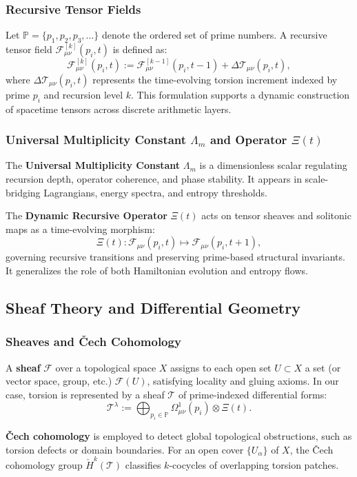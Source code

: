 \documentclass{article}
\theoremstyle{plain}
\begin{document}
\subsubsection*{Recursive Tensor Fields}
Let $\mathbb{P} = \{p_1, p_2, p_3, \ldots\}$ denote the ordered set of prime numbers. A recursive tensor field $\mathcal{F}_{\mu\nu}^{[k]}(p_i, t)$ is defined as:
\[
\mathcal{F}_{\mu\nu}^{[k]}(p_i, t) := \mathcal{F}_{\mu\nu}^{[k-1]}(p_i, t-1) + \Delta \mathcal{T}_{\mu\nu}(p_i, t),
\]
where $\Delta \mathcal{T}_{\mu\nu}(p_i, t)$ represents the time-evolving torsion increment indexed by prime $p_i$ and recursion level $k$. This formulation supports a dynamic construction of spacetime tensors across discrete arithmetic layers.

\subsubsection*{Universal Multiplicity Constant $\Lambda_m$ and Operator $\Xi(t)$}
The \textbf{Universal Multiplicity Constant} $\Lambda_m$ is a dimensionless scalar regulating recursion depth, operator coherence, and phase stability. It appears in scale-bridging Lagrangians, energy spectra, and entropy thresholds.

The \textbf{Dynamic Recursive Operator} $\Xi(t)$ acts on tensor sheaves and solitonic maps as a time-evolving morphism:
\[
\Xi(t): \mathcal{F}_{\mu\nu}(p_i, t) \mapsto \mathcal{F}_{\mu\nu}(p_i, t+1),
\]
governing recursive transitions and preserving prime-based structural invariants. It generalizes the role of both Hamiltonian evolution and entropy flows.

\subsection{Sheaf Theory and Differential Geometry}

\subsubsection*{Sheaves and Čech Cohomology}
A \textbf{sheaf} $\mathcal{F}$ over a topological space $X$ assigns to each open set $U \subset X$ a set (or vector space, group, etc.) $\mathcal{F}(U)$, satisfying locality and gluing axioms. In our case, torsion is represented by a sheaf $\mathcal{T}$ of prime-indexed differential forms:
\[
\mathcal{T}^\lambda := \bigoplus_{p_i \in \mathbb{P}} \Omega^1_{\mu\nu}(p_i) \otimes \Xi(t).
\]

\textbf{Čech cohomology} is employed to detect global topological obstructions, such as torsion defects or domain boundaries. For an open cover $\{U_\alpha\}$ of $X$, the Čech cohomology group $\check{H}^k(\mathcal{T})$ classifies $k$-cocycles of overlapping torsion patches.
\end{document}
